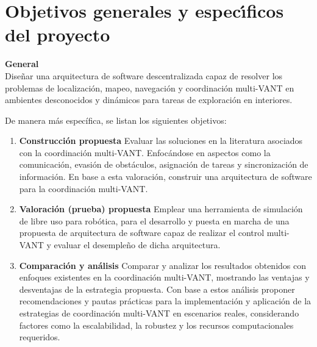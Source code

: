 \documentclass[11pt,epsf,times]{article}
\begin{document}
\newpage
\section*{Objetivos generales y espec\'{\i}ficos del proyecto}

\textbf{General} \\

Dise\~{n}ar una arquitectura de software descentralizada capaz de resolver los problemas de localizaci\'{o}n, mapeo, navegaci\'{o}n y coordinaci\'{o}n multi-VANT en ambientes desconocidos y din\'{a}micos para tareas de exploraci\'{o}n en interiores.



\bigskip
\noindent
De manera m\'{a}s espec\'{i}fica, se listan los siguientes objetivos: %

\begin{enumerate}

\item \textbf{Construcci\'{o}n propuesta} Evaluar las soluciones en la literatura asociados con la coordinaci\'{o}n multi-VANT. Enfoc\'{a}ndose en aspectos como la comunicaci\'{o}n, evasi\'{o}n de obst\'{a}culos, asignaci\'{o}n de tareas y sincronizaci\'{o}n de informaci\'{o}n. En base a esta valoraci\'{o}n, construir una arquitectura de software para la coordinaci\'{o}n multi-VANT.

\item \textbf{Valoraci\'{o}n (prueba) propuesta} Emplear una herramienta de simulaci\'{o}n de libre uso para rob\'{o}tica, para el desarrollo y puesta en marcha de una propuesta de arquitectura de software capaz de realizar el control multi-VANT y evaluar el desemple\~{n}o de dicha arquitectura.
  
\item \textbf{Comparaci\'{o}n y an\'{a}lisis} Comparar y analizar los resultados obtenidos con enfoques existentes en la coordinaci\'{o}n multi-VANT, mostrando las ventajas y desventajas de la estrategia propuesta. Con base a estos an\'{a}lisis proponer recomendaciones y pautas pr\'{a}cticas para la implementaci\'{o}n y aplicaci\'{o}n de la estrategias de coordinaci\'{o}n multi-VANT en escenarios reales, considerando factores como la escalabilidad, la robustez y los recursos computacionales requeridos.

\end{enumerate}
\end{document}
